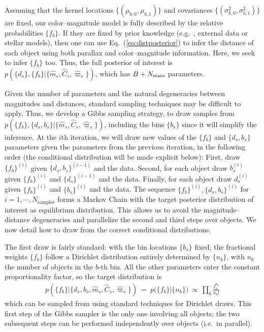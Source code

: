 \documentclass[manuscript, letterpaper]{aastex6}
\makeatletter
\let\origsubsection\subsection
\renewcommand\subsection{\@ifstar{\starsubsection}{\nostarsubsection}}
\newcommand\nostarsubsection[1]{\subsectionprelude\origsubsection{#1}}
\newcommand\starsubsection[1]{\subsectionprelude\origsubsection*{#1}}
\newcommand\subsectionprelude{\vspace{1em}}
\newcommand{\ie}{{{i.e.}~}}
\newcommand{\eg}{{{e.g.}~}}
\newcommand{\equref}[1]{{\xspace}Eq.~(\ref{#1})}
\newcommand{\eqn}[1]{\begin{eqnarray}#1\end{eqnarray}}
\newcommand{\nobj}{{N_{\rm stars}}}
\makeatother
\begin{document}
\subsection{Inference}

Assuming that the kernel locations $\{  (\mu_{b,0}, \mu_{b,1}) \}$ and covariances $\{(\sigma_{b,0}^2, \sigma_{b,1}^2)\}$ are fixed, our color--magnitude model is fully described by the relative probabilities $\{ f_{b} \}$. 
If they are fixed by prior knowledge (\eg, external data or stellar models), then one can use \equref{eq:distposterior} to infer the distance of each object using both parallax and color--magnitude information.
Here, we seek to infer $\{ f_{b} \}$ too.
Thus, the full posterior of interest is $p(\{ d_s \}, \{ f_{b} \} | \{ \hat{m}_s, \hat{C}_s, \hat{\varpi}_s \})$, which has $B + \nobj$ parameters.

Given the number of parameters and the natural degeneracies between magnitudes and distances, standard sampling techniques may be difficult to apply.
Thus, we develop a Gibbs sampling strategy, to draw samples from $p(\{ f_{b} \},\{d_s, b_s\}  \rvert \{\hat{m}_s, \hat{C}_s, \hat{\varpi}_s\})$, including the bins $\{ b_s\}$ since it will simplify the inference. 
At the $i$th iteration, we will draw new values of the $\{ f_{b} \}$ and $\{d_s, b_s\}$ parameters given the parameters from the previous iteration, in the following order (the conditional distribution will be made explicit below):
First, draw $\{ f_{b} \}^{(i)}$ given $\{d_s, b_s\}^{(i-1)}$ and the data. 
Second, for each object draw $b_s^{(i)}$ given $\{ f_{b} \}^{(i)}$ and $\{d_s\}^{(i-1)}$ and the data. 
Finally, for each object draw $d_s^{(i)}$ given $\{ f_{b} \}^{(i)}$ and $\{b_s\}^{(i)}$ and the data.
The sequence $\{ f_{b} \}^{(i)},\{d_s, b_s\}^{(i)}$ for $i=1, \cdots, N_\mathrm{samples}$ forms a Markov Chain with the target posterior distribution of interest as equilibrium distribution.
This allows us to avoid the magnitude--distance degeneracies and parallelize the second and third steps over objects.
We now detail how to draw from the correct conditional distributions.

The first draw is fairly standard: with the bin locations $\{b_s\}$ fixed, the fractional weights $\{ f_{b} \}$ follow a Dirichlet distribution entirely determined by $\{n_b \}$, with $n_b$ the number of objects in the $b$-th bin.
All the other parameters enter the constant proportionality factor, so the target distribution is
\eqn{
	p\left(\bigl\{ f_b \bigr\} \bigr\rvert \bigl\{ d_s, b_s, \hat{m}_s, \hat{C}_s, \hat{\varpi}_s \bigr\} \right) \ = \ p\bigl( \bigl\{ f_b \bigr\} \bigr\rvert \{n_b \} \bigr) \ \propto\  \prod_b \frac{ f_b^{n_b} }{n_b !}
}
which can be sampled from using standard techniques for Dirichlet draws.
This first step of the Gibbs sampler is the only one involving all objects; the two subsequent steps can be performed independently over objects (\ie in parallel).
\end{document}
